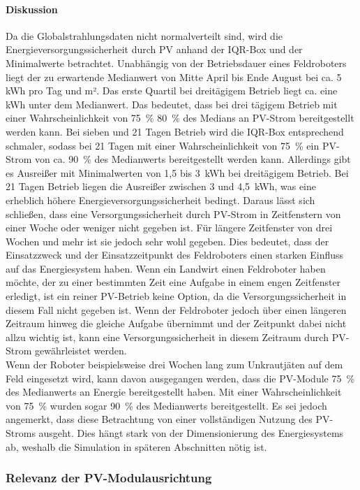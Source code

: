 \paragraph{Diskussion}
Da die Globalstrahlungsdaten nicht normalverteilt sind, wird die Energieversorgungssicherheit durch PV anhand der IQR-Box und der Minimalwerte betrachtet. Unabhängig von der Betriebsdauer eines Feldroboters liegt der zu erwartende Medianwert von Mitte April bis Ende August bei ca. 5 kWh pro Tag und m². Das erste Quartil bei dreitägigem Betrieb liegt ca. eine kWh unter dem Medianwert. Das bedeutet, dass bei drei tägigem Betrieb mit einer Wahrscheinlichkeit von 75~\% 80~\% des Medians an PV-Strom bereitgestellt werden kann. Bei sieben und 21 Tagen Betrieb wird die IQR-Box entsprechend schmaler, sodass bei 21 Tagen mit einer Wahrscheinlichkeit von 75~\% ein PV-Strom von ca. 90~\% des Medianwerts bereitgestellt werden kann. Allerdings gibt es Ausreißer mit Minimalwerten von 1,5 bis 3~kWh bei dreitägigem Betrieb. Bei 21 Tagen Betrieb liegen die Ausreißer zwischen 3 und 4,5~kWh, was eine erheblich höhere Energieversorgungssicherheit bedingt. Daraus lässt sich schließen, dass eine Versorgungssicherheit durch PV-Strom in Zeitfenstern von einer Woche oder weniger nicht gegeben ist. Für längere Zeitfenster von drei Wochen und mehr ist sie jedoch sehr wohl gegeben. Dies bedeutet, dass der Einsatzzweck und der Einsatzzeitpunkt des Feldroboters einen starken Einfluss auf das Energiesystem haben. Wenn ein Landwirt einen Feldroboter haben möchte, der zu einer bestimmten Zeit eine Aufgabe in einem engen Zeitfenster erledigt, ist ein reiner PV-Betrieb keine Option, da die Versorgungssicherheit in diesem Fall nicht gegeben ist. Wenn der Feldroboter jedoch über einen längeren Zeitraum hinweg die gleiche Aufgabe übernimmt und der Zeitpunkt dabei nicht allzu wichtig ist, kann eine Versorgungssicherheit in diesem Zeitraum durch PV-Strom gewährleistet werden. \\
Wenn der Roboter beispielsweise drei Wochen lang zum Unkrautjäten auf dem Feld eingesetzt wird, kann davon ausgegangen werden, dass die PV-Module 75~\% des Medianwerts an Energie bereitgestellt haben. Mit einer Wahrscheinlichkeit von 75~\% wurden sogar 90~\% des Medianwerts bereitgestellt. Es sei jedoch angemerkt, dass diese Betrachtung von einer vollständigen Nutzung des PV-Stroms ausgeht. Dies hängt stark von der Dimensionierung des Energiesystems ab, weshalb die Simulation in späteren Abschnitten nötig ist.

\subsubsection{Relevanz der PV-Modulausrichtung} \label{ausrichtung}

